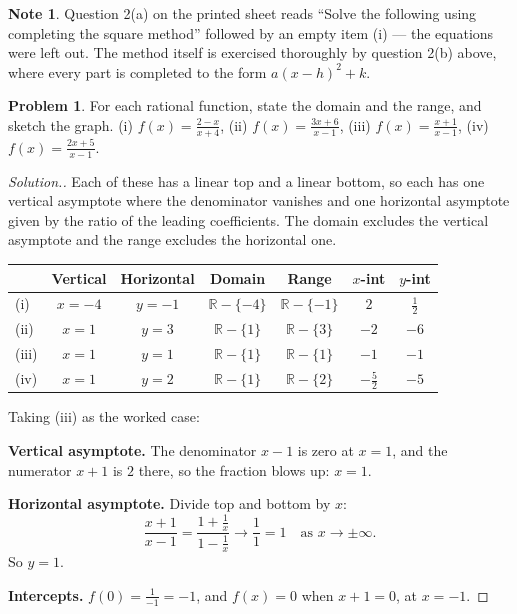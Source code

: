 \documentclass[11pt,a4paper]{article}
\theoremstyle{definition}
\newtheorem{note}[thm]{Note}
\newtheorem{problemx}{Problem}[section]
\newenvironment{problem}{\begin{problemx}}{\end{problemx}}
\newenvironment{solution}
  {\renewcommand{\qedsymbol}{}\begin{proof}[\textit{Solution}.]}
  {\end{proof}}
\begin{document}
\begin{note}
Question 2(a) on the printed sheet reads ``Solve the following using completing the
square method'' followed by an empty item (i) --- the equations were left out. The
method itself is exercised thoroughly by question 2(b) above, where every part is
completed to the form $a(x-h)^2+k$.
\end{note}


\begin{problem}
For each rational function, state the domain and the range, and sketch the graph.
\quad (i) $f(x)=\frac{2-x}{x+4}$, \quad (ii) $f(x)=\frac{3x+6}{x-1}$, \quad
(iii) $f(x)=\frac{x+1}{x-1}$, \quad (iv) $f(x)=\frac{2x+5}{x-1}$.
\end{problem}

\begin{solution}
Each of these has a linear top and a linear bottom, so each has one vertical asymptote
where the denominator vanishes and one horizontal asymptote given by the ratio of the
leading coefficients. The domain excludes the vertical asymptote and the range excludes
the horizontal one.

\begin{table}[H]
\centering
\begin{tabular}{|l|c|c|c|c|c|c|}
\hline
 & Vertical & Horizontal & Domain & Range & $x$-int & $y$-int\\
\hline
(i) & $x=-4$ & $y=-1$ & $\mathbb{R}-\{-4\}$ & $\mathbb{R}-\{-1\}$ & $2$ & $\frac{1}{2}$\\
(ii) & $x=1$ & $y=3$ & $\mathbb{R}-\{1\}$ & $\mathbb{R}-\{3\}$ & $-2$ & $-6$\\
(iii) & $x=1$ & $y=1$ & $\mathbb{R}-\{1\}$ & $\mathbb{R}-\{1\}$ & $-1$ & $-1$\\
(iv) & $x=1$ & $y=2$ & $\mathbb{R}-\{1\}$ & $\mathbb{R}-\{2\}$ & $-\frac{5}{2}$ & $-5$\\
\hline
\end{tabular}
\end{table}

Taking (iii) as the worked case:

\textbf{Vertical asymptote.} The denominator $x-1$ is zero at $x=1$, and the numerator
$x+1$ is $2$ there, so the fraction blows up: $x=1$.

\textbf{Horizontal asymptote.} Divide top and bottom by $x$:
$$\frac{x+1}{x-1}=\frac{1+\frac{1}{x}}{1-\frac{1}{x}}\longrightarrow\frac{1}{1}=1
\quad\text{as } x\to\pm\infty.$$
So $y=1$.

\textbf{Intercepts.} $f(0)=\frac{1}{-1}=-1$, and $f(x)=0$ when $x+1=0$, at $x=-1$.


\end{solution}
\end{document}
